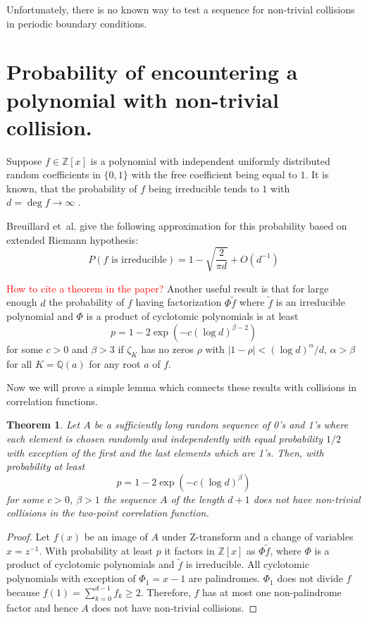 \documentclass[12pt, a4paper]{article}
\newtheorem{theorem}{Theorem}
\begin{document}
Unfortunately, there is no known way to test a sequence for non-trivial
collisions in periodic boundary conditions.

\section{Probability of encountering a polynomial with non-trivial collision.}

Suppose $f \in \mathbb{Z}[x]$ is a polynomial with independent uniformly
distributed random coefficients in $\{0, 1\}$ with the free coefficient being
equal to $1$. It is known, that the probability of $f$ being irreducible tends
to $1$ with $d = \deg f \to \infty$ \cite{konyagin1999number}.

Breuillard et~al. \cite{breuillard2019irreducibility} give the following
approximation for this probability based on extended Riemann hypothesis:
\begin{equation}
  P(\text{$f$ is irreducible}) = 1 - \sqrt{\frac{2}{\pi d}} + O(d^{-1})
  \label{eq:prob-irr}
\end{equation}

\textcolor{red}{How to cite a theorem in the paper?}
Another useful result is that for large enough $d$ the probability
of $f$ having factorization $\Phi \tilde{f}$ where $\tilde{f}$ is an irreducible
polynomial and $\Phi$ is a product of cyclotomic polynomials is at least
\begin{equation}
  p = 1 - 2\exp(-c(\log d)^{\beta - 2})
  \label{eq:prob-cyc-1}
\end{equation}
for some $c > 0$ and $\beta > 3$ if $\zeta_K$ has no zeros $\rho$ with
$|1 - \rho| < (\log d)^\alpha/d$, $\alpha > \beta$ for all $K = \mathbb{Q}(a)$
for any root $a$ of $f$.

Now we will prove a simple lemma which connects these results with collisions in
correlation functions.
\begin{theorem}
  \label{the:sequence}
  Let $A$ be a sufficiently long random sequence of 0's and 1's where each
  element is chosen randomly and independently with equal probability $1/2$ with
  exception of the first and the last elements which are 1's. Then, with
  probability at least
  \begin{equation*}
    p = 1 - 2\exp(-c(\log d)^\beta)
  \end{equation*}
  for some $c > 0$, $\beta > 1$ the sequence $A$ of the length $d+1$ does not
  have non-trivial collisions in the two-point correlation function.
\end{theorem}
\begin{proof}
  Let $f(x)$ be an image of $A$ under Z-transform and a change of variables
  $x = z^{-1}$. With probability at least $p$ it factors in $\mathbb{Z}[x]$ as
  $\Phi \tilde{f}$, where $\Phi$ is a product of cyclotomic polynomials and
  $\tilde{f}$ is irreducible. All cyclotomic polynomials with exception of
  $\Phi_1 = x - 1$ are palindromes. $\Phi_1$ does not divide $f$ because
  $f(1) = \sum\limits_{k=0}^{d-1} f_k \ge 2$. Therefore, $f$ has at most one
  non-palindrome factor and hence $A$ does not have non-trivial collisions.
\end{proof}
\end{document}
